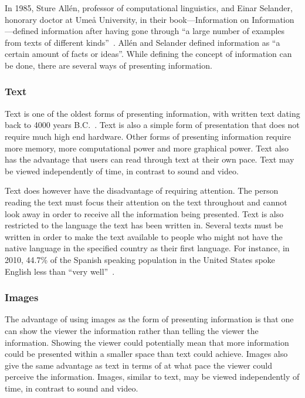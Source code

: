 In 1985, Sture All{\'e}n, professor of computational linguistics, and Einar Selander, honorary doctor at Ume{\aa} University, in their book---Information on Information---defined information after having gone through ``a large number of examples from texts of different kinds''~\cite{informationDef1}. All{\'e}n and Selander defined information as ``a certain amount of facts or ideas''. While defining the concept of information can be done, there are several ways of presenting information.

\newpage
\subsubsection{Text}
Text is one of the oldest forms of presenting information, with written text dating back to 4000 years B.C.~\cite{cuneiform}. Text is also a simple form of presentation that does not require much high end hardware. Other forms of presenting information require more memory, more computational power and more graphical power. Text also has the advantage that users can read through text at their own pace. Text may be viewed independently of time, in contrast to sound and video.

Text does however have the disadvantage of requiring attention. The person reading the text must focus their attention on the text throughout and cannot look away in order to receive all the information being presented. Text is also restricted to the language the text has been written in. Several texts must be written in order to make the text available to people who might not have the native language in the specified country as their first language. For instance, in 2010, 44.7\% of the Spanish speaking population in the United States spoke English less than ``very well''~\cite{spanishUS}.

\subsubsection{Images}
The advantage of using images as the form of presenting information is that one can show the viewer the information rather than telling the viewer the information. Showing the viewer could potentially mean that more information could be presented within a smaller space than text could achieve. Images also give the same advantage as text in terms of at what pace the viewer could perceive the information. Images, similar to text, may be viewed independently of time, in contrast to sound and video.

